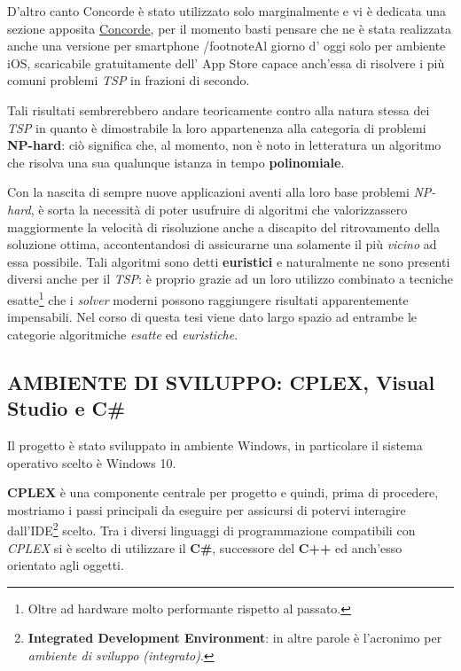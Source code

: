 \documentclass[11pt]{article}
\begin{document}
D'altro canto Concorde è stato utilizzato solo marginalmente e vi è dedicata una sezione apposita \hyperref[sec:ConcordeS]{Concorde}, per il momento basti pensare che ne è stata realizzata anche una versione per smartphone /footnote{Al giorno d' oggi solo per ambiente iOS, scaricabile gratuitamente dell' App Store} capace anch'essa di risolvere i più comuni problemi \textit{TSP} in frazioni di secondo.

Tali risultati sembrerebbero andare teoricamente contro alla natura stessa dei \textit{TSP} in quanto è dimostrabile la loro appartenenza alla categoria di problemi \textbf{NP-hard}: ciò significa che, al momento, non è noto in letteratura un algoritmo che risolva una sua qualunque istanza in tempo \textbf{polinomiale}.

Con la nascita di sempre nuove applicazioni aventi alla loro base problemi \textit{NP-hard}, è sorta la necessità di poter usufruire di algoritmi che valorizzassero maggiormente la velocità di risoluzione anche a discapito del ritrovamento della soluzione ottima, accontentandosi di assicurarne una solamente il più \textit{vicino} ad essa possibile. Tali algoritmi sono detti \textbf{euristici} e naturalmente ne sono presenti diversi anche per il \textit{TSP}: è proprio grazie ad un loro utilizzo combinato a tecniche esatte\footnote{Oltre ad hardware molto performante rispetto al passato.} che i \textit{solver} moderni possono raggiungere risultati apparentemente impensabili. Nel corso di questa tesi viene dato largo spazio ad entrambe le categorie algoritmiche \textit{esatte} ed \textit{euristiche}.


\subsection*{AMBIENTE DI SVILUPPO: CPLEX, Visual Studio e C\#}
\label{sec:AmbienteSviluppoS}

Il progetto è stato sviluppato in ambiente Windows, in particolare il sistema operativo scelto è Windows 10.

\textbf{CPLEX} è una componente centrale per progetto e quindi, prima di procedere, mostriamo i passi principali da eseguire per assicursi di potervi interagire dall'IDE\footnote{\textbf{Integrated Development Environment}: in altre parole è l'acronimo per \textit{ambiente di sviluppo (integrato)}.} scelto. Tra i diversi linguaggi di programmazione compatibili con \textit{CPLEX} si è scelto di utilizzare il \textbf{C\#}, successore del \textbf{C++} ed anch'esso orientato agli oggetti.
\end{document}
